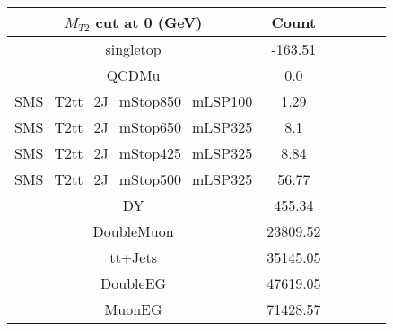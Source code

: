 \documentclass[8pt]{article}
\begin{document}
\begin{tabular}{|c|c|c|c|c|c|}
\hline
$M_{T2}$ cut at 0 (GeV) & Count \\
\hline
\hline
singletop & -163.51\\
QCDMu & 0.0\\
SMS\_T2tt\_2J\_mStop850\_mLSP100 & 1.29\\
SMS\_T2tt\_2J\_mStop650\_mLSP325 & 8.1\\
SMS\_T2tt\_2J\_mStop425\_mLSP325 & 8.84\\
SMS\_T2tt\_2J\_mStop500\_mLSP325 & 56.77\\
DY & 455.34\\
DoubleMuon & 23809.52\\
tt+Jets & 35145.05\\
DoubleEG & 47619.05\\
MuonEG & 71428.57\\
\hline
\hline
\end{tabular}
\end{document}
